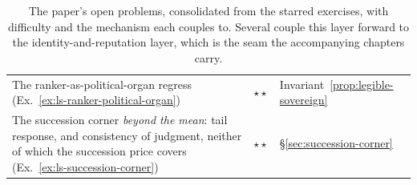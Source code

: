 \documentclass[11pt,a4paper]{article}
\theoremstyle{definition}
\theoremstyle{plain}
\begin{document}
\begin{table}[H]
\begin{tabular}{@{}p{}p{}p{}@{}}
The ranker-as-political-organ regress (Ex.~\ref{ex:ls-ranker-political-organ}) & $\star\star$ & Invariant~\ref{prop:legible-sovereign} \\
The succession corner \emph{beyond the mean}: tail response, and consistency of
judgment, neither of which the succession price covers
(Ex.~\ref{ex:ls-succession-corner}) & $\star\star$ & \S\ref{sec:succession-corner} \\
\bottomrule
\end{tabular}
\caption{The paper's open problems, consolidated from the starred exercises, with
difficulty and the mechanism each couples to. Several couple this layer forward to the
identity-and-reputation layer, which is the seam the accompanying chapters carry.}
\label{tab:open}
\end{table}

\end{document}
